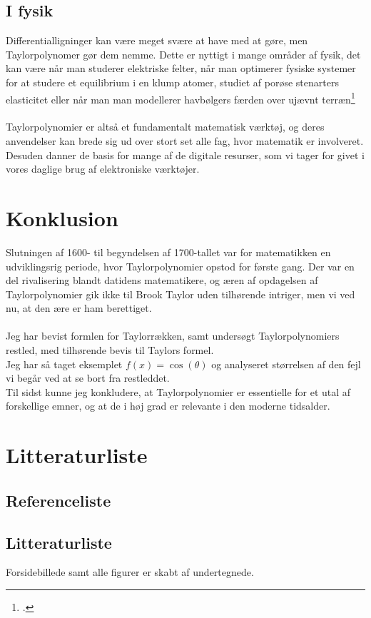 \documentclass[12pt, a4paper]{article}
\begin{document}
\begin{refsection}
\subsection{I fysik}
Differentialligninger kan være meget svære at have med at gøre, men Taylorpolynomer gør dem nemme. Dette er nyttigt i mange områder af fysik, det kan være når man studerer elektriske felter, når man optimerer fysiske systemer for at studere et equilibrium i en klump atomer, studiet af porøse stenarters elasticitet eller når man man modellerer havbølgers færden over ujævnt terræn\footcite{applicationsoftaylor}\\
\\
Taylorpolynomier er altså et fundamentalt matematisk værktøj, og deres anvendelser kan brede sig ud over stort set alle fag, hvor matematik er involveret. Desuden danner de basis for mange af de digitale resurser, som vi tager for givet i vores daglige brug af elektroniske værktøjer.

\section{Konklusion} %
Slutningen af 1600- til begyndelsen af 1700-tallet var for matematikken en udviklingsrig periode, hvor Taylorpolynomier opstod for første gang. Der var en del rivalisering blandt datidens matematikere, og æren af opdagelsen af Taylorpolynomier gik ikke til Brook Taylor uden tilhørende intriger, men vi ved nu, at den ære er ham berettiget.\\
\\
Jeg har bevist formlen for Taylorrækken, samt undersøgt Taylorpolynomiers restled, med tilhørende bevis til Taylors formel.\\
Jeg har så taget eksemplet $f(x)=\cos{(\theta)}$ og analyseret størrelsen af den fejl vi begår ved at se bort fra restleddet.\\
Til sidst kunne jeg konkludere, at Taylorpolynomier er essentielle for et utal af forskellige emner, og at de i høj grad er relevante i den moderne tidsalder.
\section{Litteraturliste}
\subsection{Referenceliste}
\printbibliography[title=Cited]
\end{refsection}
\subsection{Litteraturliste}
\nocite{*}
\printbibliography
Forsidebillede samt alle figurer er skabt af undertegnede.
\end{document}
